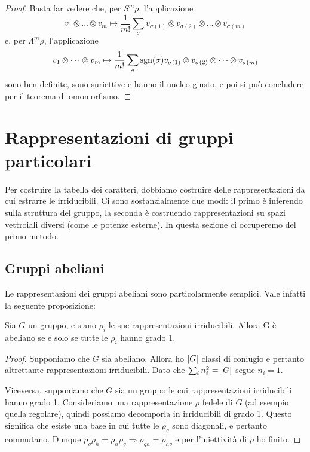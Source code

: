 \documentclass[a4paper,10pt,oneside]{math_article}
\newcommand{\tensor}{\otimes}
\begin{document}
    \begin{proof}
     Basta far vedere che, per $S^m\rho$, l'applicazione
     \[
      v_1 \tensor \dots \tensor v_m \mapsto \frac1{m!} \sum_\sigma v_{\sigma(1)}\tensor v_{\sigma(2)} \tensor \dots \tensor v_{\sigma(m)}
     \]
     e, per $\Lambda^m\rho$, l'applicazione
     \[
      v_1 \tensor \dots \tensor v_m \mapsto \frac1{m!} \sum_\sigma \sgn(\sigma) v_{\sigma(1)}\tensor v_{\sigma(2)} \tensor \dots \tensor v_{\sigma(m)}
     \] sono ben definite, sono suriettive e hanno il nucleo giusto, e poi si può concludere per il teorema di omomorfismo. 
    \end{proof}
    
    

  
 
  \section{Rappresentazioni di gruppi particolari}
   Per costruire la tabella dei caratteri, dobbiamo costruire delle rappresentazioni da cui estrarre le irriducibili. Ci sono sostanzialmente due modi: il primo è inferendo sulla struttura del gruppo, la seconda è costruendo rappresentazioni su spazi vettroiali diversi (come le potenze esterne). In questa sezione ci occuperemo del primo metodo.
  
  \subsection{Gruppi abeliani}
   Le rappresentazioni dei gruppi abeliani sono particolarmente semplici. Vale infatti la seguente proposizione:
   \begin{myprop}
    Sia $G$ un gruppo, e siano $\rho_i$ le sue rappresentazioni irriducibili. Allora G è abeliano se e solo se tutte le $\rho_i$ hanno grado 1.
   \end{myprop}
    
   \begin{proof}
    Supponiamo che $G$ sia abeliano. Allora ho $\left|G\right|$ classi di coniugio e pertanto altrettante rappresentazioni irriducibili. Dato che $\sum_i n_i^2 = \left|G\right|$ segue $n_i = 1$.
    
    Viceversa, supponiamo che $G$ sia un gruppo le cui rappresentazioni irriducibili hanno grado 1. Consideriamo una rappresentazione $\rho$ fedele di $G$ (ad esempio quella regolare), quindi possiamo decomporla in irriducibili di grado 1. Questo significa che esiste una base in cui tutte le $\rho_g$ sono diagonali, e pertanto commutano. Dunque $\rho_g\rho_h = \rho_h\rho_g \Rightarrow \rho_{gh} = \rho_{hg}$ e per l'iniettività di $\rho$ ho finito.
   \end{proof}
\end{document}

